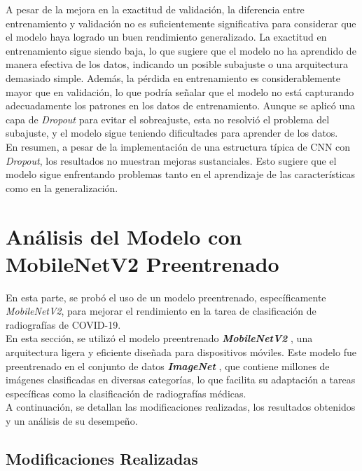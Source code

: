 \documentclass{article}
\begin{document}
A pesar de la mejora en la exactitud de validación, la diferencia entre entrenamiento y validación no es suficientemente significativa para considerar que el modelo haya logrado un buen rendimiento generalizado. La exactitud en entrenamiento sigue siendo baja, lo que sugiere que el modelo no ha aprendido de manera efectiva de los datos, indicando un posible subajuste o una arquitectura demasiado simple. Además, la pérdida en entrenamiento es considerablemente mayor que en validación, lo que podría señalar que el modelo no está capturando adecuadamente los patrones en los datos de entrenamiento. Aunque se aplicó una capa de \textit{Dropout} para evitar el sobreajuste, esta no resolvió el problema del subajuste, y el modelo sigue teniendo dificultades para aprender de los datos.
\\

En resumen, a pesar de la implementación de una estructura típica de CNN con \textit{Dropout}, los resultados no muestran mejoras sustanciales. Esto sugiere que el modelo sigue enfrentando problemas tanto en el aprendizaje de las características como en la generalización.



	\section{Análisis del Modelo con MobileNetV2 Preentrenado}
	
	En esta parte, se probó el uso de un modelo preentrenado, específicamente \textit{MobileNetV2}, para mejorar el rendimiento en la tarea de clasificación de radiografías de COVID-19. 
	\\
	
	En esta sección, se utilizó el modelo preentrenado \textbf{\textit{MobileNetV2}} \cite{sandler2018mobilenetv2}, una arquitectura ligera y eficiente diseñada para dispositivos móviles. Este modelo fue preentrenado en el conjunto de datos \textbf{\textit{ImageNet}} \cite{deng2009imagenet}, que contiene millones de imágenes clasificadas en diversas categorías, lo que facilita su adaptación a tareas específicas como la clasificación de radiografías médicas.
	\\ 
	
	A continuación, se detallan las modificaciones realizadas, los resultados obtenidos y un análisis de su desempeño.
	
	\subsection{Modificaciones Realizadas}
	
\end{document}
